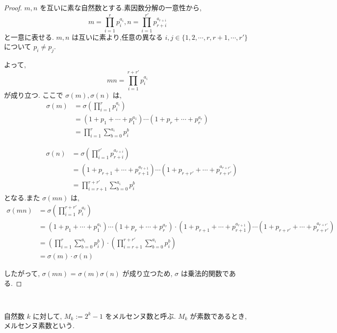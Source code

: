 \begin{proof}
\(m, n\) を互いに素な自然数とする.素因数分解の一意性から,
\[
m = \prod_{i=1}^{r}p_i^{a_i}, n = \prod_{i=1}^{r'}p_{r+i}^{a_{r+i}}
\]と一意に表せる.
\(m, n\) は互いに素より,任意の異なる \(i,j\in\{1, 2, \cdots, r, r+1, \cdots, r'\}\) について \(p_i \neq p_j\).

よって, \[mn = \prod_{i=1}^{r+r'}p_i^{a_i}\] が成り立つ.
ここで \(\sigma(m), \sigma(n)\) は,
\begin{align*}
\sigma(m) &= \sigma(\prod_{i=1}^{r}p_i^{a_i})\\
          &= (1 + p_1 + \cdots + p_1^{a_1}) \cdots (1 + p_r + \cdots + p_r^{a_r})\\
          &= \prod_{i=1}^{r}\sum_{b=0}^{a_i}p_i^{b}
\end{align*}

\begin{align*}
\;\;\;\;\;\;\;\;\;\;\;\;\;\;\;\sigma(n) &= \sigma(\prod_{i=1}^{r'}p_{r+i}^{a_{r+i}})\\
          &= (1 + p_{r+1} + \cdots + p_{r+1}^{a_{r+1}}) \cdots (1 + p_{r+r'} + \cdots + p_{r+r'}^{a_{r+r'}})\\
          &= \prod_{i=r+1}^{r+r'}\sum_{b=0}^{a_i}p_i^{b}
\end{align*}
となる.また \(\sigma(mn)\) は,
\begin{align*}
\sigma(mn) &= \sigma(\prod_{i=1}^{r+r'}p_i^{a_i})\\
           &= (1 + p_1 + \cdots + p_1^{a_1}) \cdots (1 + p_r + \cdots + p_r^{a_r})
              \cdot (1 + p_{r+1} + \cdots + p_{r+1}^{a_{r+1}}) \cdots (1 + p_{r+r'} + \cdots + p_{r+r'}^{a_{r+r'}})\\
           &= (\prod_{i=1}^{r}\sum_{b=0}^{a_i}p_i^{b}) \cdot (\prod_{i=r+1}^{r+r'}\sum_{b=0}^{a_i}p_i^{b})\\
           &= \sigma(m) \cdot \sigma(n)
\end{align*}

したがって, \(\sigma(mn)\) = \(\sigma(m)\sigma(n)\) が成り立つため, \(\sigma\) は乗法的関数である.
\end{proof}


\begin{definition}[メルセンヌ数]\label{Mersenne}\leanok~\

自然数 \(k\) に対して, \(M_k := 2^k - 1\) をメルセンヌ数と呼ぶ. \(M_k\) が素数であるとき,メルセンヌ素数という.

\end{definition}


